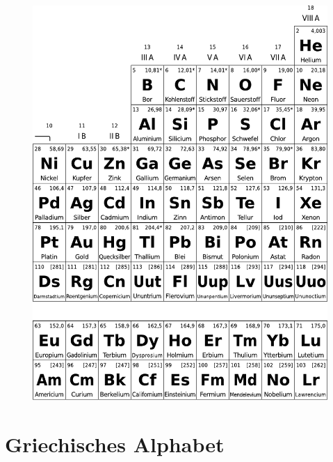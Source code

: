 \begin{appendices}
\begin{figure}
	\centering
	\includegraphics[width=\textwidth]{../fig/periodensystem_2.pdf}
\end{figure}

\chapter{Griechisches Alphabet}


\end{appendices}
